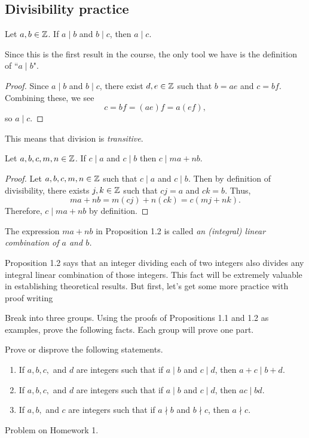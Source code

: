 \documentclass{ximera}
\begin{document}
\subsection{Divisibility practice}%

\begin{prop*}
 Let $a,b\in\mathbb Z$. If $a\mid b$ and $b \mid c$, then $a\mid c$.
\end{prop*}

Since this is the first result in the course, the only tool we have is the definition of ``$a\mid b$". 

\begin{proof}
Since $a\mid b$ and $b \mid c$, there exist $d,e\in\mathbb Z$ such that $b=ae$ and $c=bf$. Combining these, we see \[c=bf=(ae)f=a(ef),\] so $a\mid c$.
\end{proof}

This means that division is \emph{transitive}. 


\begin{prop*} Let $a,b,c,m,n\in\mathbb Z$.
 If $c\mid a$ and $c\mid b$ then $c\mid ma+nb$.
\end{prop*}
\begin{proof}
 Let $a,b,c,m,n\in\mathbb Z$ such that $c\mid a$ and $c\mid b$. Then by definition of divisibility, there exists $j,k\in\mathbb Z$ such that $cj=a$ and $ck=b$. Thus, \[ma+nb=m(cj)+n(ck)=c(mj+nk).\] Therefore, $c\mid ma+nb$ by definition.
\end{proof}

\begin{defn}
 The expression $ma+nb$ in Proposition 1.2 is called \emph{an (integral) linear combination of $a$ and $b$.}
\end{defn}
Proposition 1.2 says that an integer dividing each of two integers also divides any integral linear combination of those integers. This fact will be extremely valuable in establishing theoretical results. But first, let's get some more practice with proof writing

Break into three groups. Using the proofs of Propositions 1.1 and 1.2 as examples, prove the following facts. Each group will prove one part.

\begin{br}\label{divisfacts}
 Prove or disprove the following statements.
\begin{enumerate}[label=(\alph*)]
\item If $a,b,c,$ and $d$ are integers such that if $a\mid b$ and $c\mid d$, then $a+c\mid b+d$.
\item If $a,b,c,$ and $d$ are integers such that if $a\mid b$ and $c\mid d$, then $ac\mid bd$.
\item If $a,b,$ and $c$ are integers such that if $a\nmid b$ and $b\nmid c$, then $a\nmid c$.
\end{enumerate}
\end{br}
\begin{solution}
Problem on Homework 1.
\end{solution}
\end{document}
